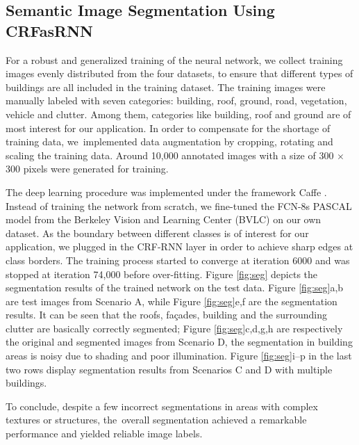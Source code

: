 \subsection{Semantic Image Segmentation Using CRFasRNN}
For a robust and generalized training of the neural network, we collect training images evenly distributed from the four datasets, to ensure that different types of buildings are all included in the training dataset. The training images were manually labeled with seven categories: building, roof, ground, road, vegetation, vehicle and clutter. Among them, categories like building, roof and ground are of most interest for our application. In order to compensate for the shortage of training data, we~implemented data augmentation by cropping, rotating and scaling the training data. Around 10,000 annotated images with a size of 300 $\times$ 300 pixels were generated for training.


The deep learning procedure was implemented under the framework Caffe \cite{jia2014caffe}. Instead of training the network from scratch, we fine-tuned the FCN-8s PASCAL model from the Berkeley Vision and Learning Center (BVLC) on our own dataset. As the boundary between different classes is of interest for our application, we plugged in the CRF-RNN layer in order to achieve sharp edges at class borders. The training process started to converge at iteration 6000 and was stopped at iteration 74,000 before over-fitting. Figure \ref{fig:seg} depicts the segmentation results of the trained network on the test data. Figure \ref{fig:seg}a,b are test images from Scenario A, while Figure \ref{fig:seg}e,f are the segmentation results. It can be seen that the roofs, fa\c{c}ades, building and the surrounding clutter are basically correctly segmented; Figure \ref{fig:seg}c,d,g,h are respectively the original and segmented images from Scenario D, the segmentation in building areas is noisy due to shading and poor illumination. Figure \ref{fig:seg}i--p in the last two rows display segmentation results from Scenarios C and D with multiple buildings. 

To conclude, despite a few incorrect segmentations in areas with complex textures or structures, the~overall segmentation achieved a remarkable performance and yielded reliable image labels. 

